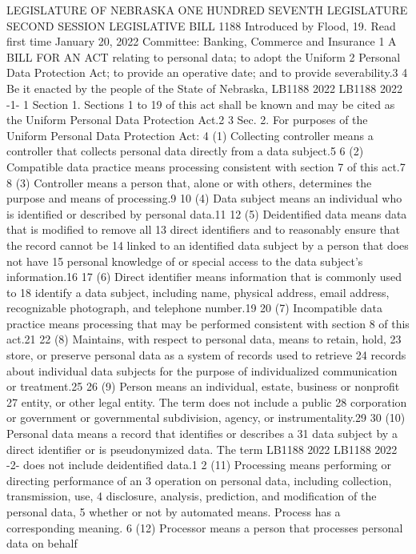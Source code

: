 LEGISLATURE OF NEBRASKA
ONE HUNDRED SEVENTH LEGISLATURE
SECOND SESSION
LEGISLATIVE BILL 1188
Introduced by Flood, 19.
Read first time January 20, 2022
Committee: Banking, Commerce and Insurance
1 A BILL FOR AN ACT relating to personal data; to adopt the Uniform
2 Personal Data Protection Act; to provide an operative date; and to
provide severability.3
4 Be it enacted by the people of the State of Nebraska,
LB1188
2022
LB1188
2022
-1-
1 Section 1. Sections 1 to 19 of this act shall be known and may be
cited as the Uniform Personal Data Protection Act.2
3 Sec. 2. For purposes of the Uniform Personal Data Protection Act:
4 (1) Collecting controller means a controller that collects personal
data directly from a data subject.5
6 (2) Compatible data practice means processing consistent with
section 7 of this act.7
8 (3) Controller means a person that, alone or with others, determines
the purpose and means of processing.9
10 (4) Data subject means an individual who is identified or described
by personal data.11
12 (5) Deidentified data means data that is modified to remove all
13 direct identifiers and to reasonably ensure that the record cannot be
14 linked to an identified data subject by a person that does not have
15 personal knowledge of or special access to the data subject's
information.16
17 (6) Direct identifier means information that is commonly used to
18 identify a data subject, including name, physical address, email address,
recognizable photograph, and telephone number.19
20 (7) Incompatible data practice means processing that may be
performed consistent with section 8 of this act.21
22 (8) Maintains, with respect to personal data, means to retain, hold,
23 store, or preserve personal data as a system of records used to retrieve
24 records about individual data subjects for the purpose of individualized
communication or treatment.25
26 (9) Person means an individual, estate, business or nonprofit
27 entity, or other legal entity. The term does not include a public
28 corporation or government or governmental subdivision, agency, or
instrumentality.29
30 (10) Personal data means a record that identifies or describes a
31 data subject by a direct identifier or is pseudonymized data. The term
LB1188
2022
LB1188
2022
-2-
does not include deidentified data.1
2 (11) Processing means performing or directing performance of an
3 operation on personal data, including collection, transmission, use,
4 disclosure, analysis, prediction, and modification of the personal data,
5 whether or not by automated means. Process has a corresponding meaning.
6 (12) Processor means a person that processes personal data on behalf
